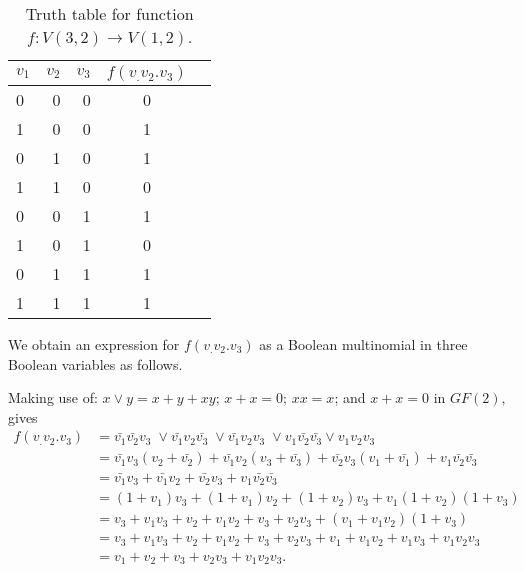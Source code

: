 
\begin{table}[!htp]\centering
\begin{tabular}{lrr|cr}\toprule
$v_1$ &$v_2$ &$v_3$ &$f(v_.v_2.v_3)$ \\\midrule
0 &0 &0 &0 \\
1 &0 &0 &1 \\
0 &1 &0 &1 \\
1 &1 &0 &0 \\
0 &0 &1 &1 \\
1 &0 &1 &0 \\
0 &1 &1 &1 \\
1 &1 &1 &1 \\
\bottomrule
\end{tabular}
\caption{Truth table for function $f:V(3,2) \rightarrow V(1,2)$.}\label{tab:4}
\end{table}
We obtain an expression for $f(v_.v_2.v_3)$ as a Boolean multinomial in three Boolean variables as follows.

Making use of: $x\lor y = x + y +xy$; $x + x = 0$; $xx=x$; and $x + x=0$ in $GF(2)$, gives
\begin{align*}
f(v_.v_2.v_3) &= \bar{v_1}\bar{v_2}v_3\; \lor
                 \bar{v_1}v_2\bar{v_3}\; \lor
                 \bar{v_1}v_2v_3\; \lor
                 v_1\bar{v_2}\bar{v_3} \lor
                 v_1 v_2 v_3\\
              &= \bar{v_1}v_3(v_2+\bar{v_2}) + 
                 \bar{v_1}v_2(v_3+\bar{v_3}) +
                 \bar{v_2}v_3(v_1+\bar{v_1}) +
                 v_1\bar{v_2}\bar{v_3}\\
              &= \bar{v_1}v_3 + 
                 \bar{v_1}v_2 +
                 \bar{v_2}v_3 +
                 v_1\bar{v_2}\bar{v_3}\\
              &= (1+v_1)v_3 + 
                 (1+v_1)v_2 +
                 (1+v_2)v_3 +
                 v_1(1+v_2)(1+v_3)\\
              &= v_3+v_1v_3 + 
                 v_2+v_1v_2 +
                 v_3 +v_2v_3+
                 (v_1+v_1v_2)(1+v_3)\\
             &= v_3+v_1v_3 + 
                 v_2+v_1v_2 +
                 v_3 +v_2v_3+
                 v_1+v_1v_2 + v_1v_3+v_1v_2v_3\\
             &= v_1 + v_2 + v_3 + v_2v_3 + v_1v_2v_3.                
\end{align*}

